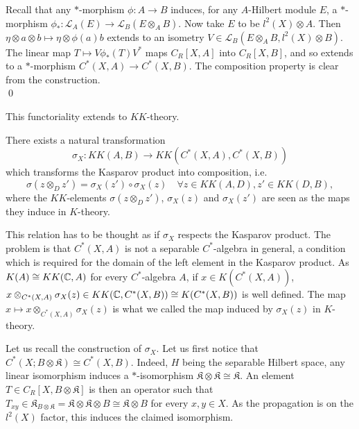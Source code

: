 \begin{dem}
Recall that any $*$-morphism $\phi : A\rightarrow B$ induces, for any $A$-Hilbert module $E$, a $*$-morphism $\phi_* : \mathcal L_A(E)\rightarrow \mathcal L_B(E\otimes_A B)$. Now take $E$ to be $l^2(X)\otimes A$. Then $\eta\otimes a\otimes b\mapsto \eta \otimes\phi(a) b $ extends to an isometry $V\in \mathcal L_B(E\otimes_A B,l^2(X)\otimes B)$.\\
The linear map $T \mapsto V\phi_*(T)V^*$ maps $C_R[X,A]$ into $C_R[X,B]$, and so extends to a $*$-morphism $C^*(X,A)\rightarrow C^*(X,B)$. The composition property is clear from the construction.\\
\qed
\end{dem}
This functoriality extends to $KK$-theory.

\begin{thm} There exists a natural transformation 
\[\sigma_X : KK(A,B)\rightarrow KK(C^*(X,A),C^*(X,B))\]
which transforms the Kasparov product into composition, i.e. 
\[\sigma(z\otimes_D z')= \sigma_X(z')\circ \sigma_X(z) \quad \forall z\in KK(A,D),z'\in KK(D,B),\]
where the $KK$-elements $\sigma(z\otimes_D z')$, $ \sigma_X(z)$ and $\sigma_X(z')$ are seen as the maps they induce in $K$-theory. 
\end{thm}

\begin{rk}
This relation has to be thought as if $\sigma_X$ respects the Kasparov product. The problem is that $C^*(X,A)$ is not a separable $C^*$-algebra in general, a condition which is required for the domain of the left element in the Kasparov product. As $K(A) \cong KK(\mathbb C,A)$ for every $C^*$-algebra $A$, if $x\in K(C^*(X,A))$, $x\otimes_{C^*(X,A)}\sigma_X(z)\in KK(\mathbb C,C^*(X,B))\cong K(C^*(X,B))$ is well defined. The map $x\mapsto x\otimes_{C^*(X,A)}\sigma_X(z)$ is what we called the map induced by $\sigma_X(z)$ in $K$-theory.
\end{rk}

Let us recall the construction of $\sigma_X$. Let us first notice that $C^*(X;B\otimes\mathfrak K)\cong C^*(X,B)$. Indeed, $H$ being the separable Hilbert space, any linear isomorphism induces a $*$-isomorphism $\mathfrak K \otimes \mathfrak K \cong \mathfrak K$. An element $T\in C_R[X,B\otimes\mathfrak K]$ is then an operator such that $T_{xy}\in \mathfrak K_{B\otimes\mathfrak K}= \mathfrak K\otimes \mathfrak K \otimes B \cong \mathfrak K\otimes B$ for every $x,y\in X$. As the propagation is on the $l^2(X)$ factor, this induces the claimed isomorphism. \\

